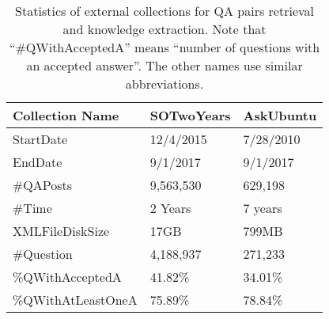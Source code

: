 \begin{table}
	\centering
	\footnotesize
	\caption{Statistics of external collections for QA pairs retrieval and knowledge extraction. Note that ``\#QWithAcceptedA'' means  ``number of questions with an accepted answer''. The other names use similar abbreviations.}
	\vspace{-0.1in}
	\label{tab:ext_collection_statistics}
	\begin{tabular}{l|l|l}
		\hline \hline
		Collection Name     & SOTwoYears & AskUbuntu \\ \hline  \hline
		StartDate           & 12/4/2015    & 7/28/2010   \\ \hline
		EndDate             & 9/1/2017     & 9/1/2017    \\ \hline
		\#QAPosts           & 9,563,530  & 629,198   \\ \hline
		\#Time              & 2 Years    & 7 years   \\ \hline
		XMLFileDiskSize     & 17GB       & 799MB     \\ \hline
		\#Question          & 4,188,937  & 271,233   \\ \hline
		\%QWithAcceptedA    & 41.82\%    & 34.01\%   \\ \hline
		\%QWithAtLeastOneA  & 75.89\%    & 78.84\%   \\ \hline   \hline
	\end{tabular}
\end{table}

